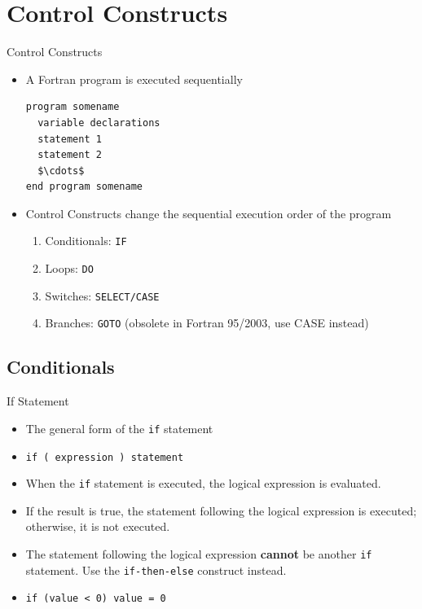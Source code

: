\documentclass[c,mathserif,compress,xcolor=svgnames]{beamer}
\newcommand{\lstfortran}[1]{\lstinline[language={[90]Fortran},basicstyle=\footnotesize\ttfamily]|#1|}
\begin{document}
\section{Control Constructs}
\begin{frame}[fragile] {Control Constructs}
  \begin{itemize}
    \item A Fortran program is executed sequentially
      \begin{lstlisting}[language={[90]Fortran},mathescape]
program somename 
  variable declarations
  statement 1
  statement 2
  $\cdots$
end program somename
      \end{lstlisting}
    \item Control Constructs change the sequential execution order of the program
      \begin{enumerate} %
        \item Conditionals: \lstfortran{IF}
        \item Loops: \lstfortran{DO}
        \item Switches: \lstfortran{SELECT/CASE}
        \item Branches: \lstfortran{GOTO} (obsolete in Fortran 95/2003, use CASE instead)
      \end{enumerate}
  \end{itemize}
\end{frame}

\subsection{Conditionals}
\begin{frame}[fragile]{If Statement}
  \begin{itemize}
    \item The general form of the \lstfortran{if} statement
    \item[] \lstfortran{if ( expression ) statement}
    \item When the \lstfortran{if} statement is executed, the logical expression is evaluated. 
    \item If the result is true, the statement following the logical expression is executed; otherwise, it is not executed.
    \item The statement following the logical expression \textbf{cannot} be another \lstfortran{if} statement. Use the \lstfortran{if-then-else} construct instead.
    \item[] \lstfortran{if (value < 0) value = 0 }
  \end{itemize}
\end{frame}
\end{document}
